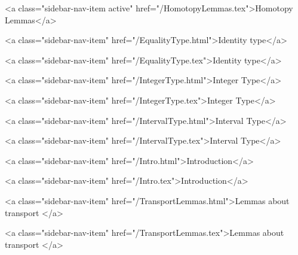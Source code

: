       
        
          <a class="sidebar-nav-item active" href="/HomotopyLemmas.tex">Homotopy Lemmas</a>
        
      
    
      
        
          <a class="sidebar-nav-item" href="/EqualityType.html">Identity type</a>
        
      
    
      
        
          <a class="sidebar-nav-item" href="/EqualityType.tex">Identity type</a>
        
      
    
      
        
          <a class="sidebar-nav-item" href="/IntegerType.html">Integer Type</a>
        
      
    
      
        
          <a class="sidebar-nav-item" href="/IntegerType.tex">Integer Type</a>
        
      
    
      
        
          <a class="sidebar-nav-item" href="/IntervalType.html">Interval Type</a>
        
      
    
      
        
          <a class="sidebar-nav-item" href="/IntervalType.tex">Interval Type</a>
        
      
    
      
        
          <a class="sidebar-nav-item" href="/Intro.html">Introduction</a>
        
      
    
      
        
          <a class="sidebar-nav-item" href="/Intro.tex">Introduction</a>
        
      
    
      
        
          <a class="sidebar-nav-item" href="/TransportLemmas.html">Lemmas about transport </a>
        
      
    
      
        
          <a class="sidebar-nav-item" href="/TransportLemmas.tex">Lemmas about transport </a>
        
      
    
